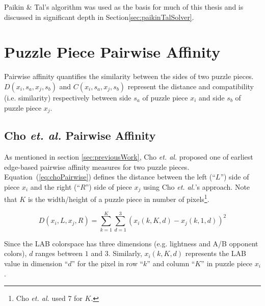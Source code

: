 \documentclass{report}
\def\eref#1{(\ref{#1})}
\begin{document}
Paikin \& Tal's algorithm was used as the basis for much of this thesis and is discussed in significant depth in Section\ref{sec:paikinTalSolver}.















\pagebreak
\section{Puzzle Piece Pairwise Affinity}\label{sec:piecePairwiseAffinity}

Pairwise affinity quantifies the similarity between the sides of two puzzle pieces.  $D(x_i, s_a, x_j, s_b)$ and $C(x_i, s_a, x_j, s_b)$ represent the distance and compatibility (i.e. similarity) respectively between side $s_a$ of puzzle piece $x_i$ and side $s_b$ of puzzle piece $x_j$.  

\subsection{Cho \textit{et. al.} Pairwise Affinity}\label{sec:choPairwiseAffinity}

As mentioned in section \ref{sec:previousWork}, Cho \textit{et. al.} \cite{cho2010} proposed one of earliest edge-based pairwise affinity measures for two puzzle pieces.  Equation~\eref{eq:choPairwise} defines the distance between the left (``$L$'') side of piece $x_i$ and the right (``$R$'') side of piece $x_j$ using Cho \textit{et. al.}'s approach.  Note that $K$ is the width/height of a puzzle piece in number of pixels\footnote{Cho \textit{et. al.} used 7 for $K$.}.  

\begin{equation} \label{eq:choPairwise}
D(x_i,L,x_j,R) = \sum_{k=1}^{K}\sum_{d=1}^{3}(x_i(k,K,d) - x_j(k,1,d))^2
\end{equation}

Since the LAB colorspace has three dimensions (e.g. lightness and A/B opponent colors), $d$ ranges between $1$ and $3$.  Similarly, $x_i(k,K,d)$ represents the LAB value in dimension ``$d$'' for the pixel in row ``$k$'' and column ``$K$'' in puzzle piece $x_i$.
\end{document}
